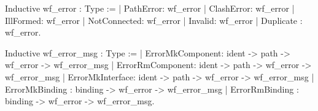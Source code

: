 Inductive wf_error : Type :=
  | PathError: wf_error | ClashError: wf_error
  | IllFormed: wf_error | NotConnected: wf_error
  | Invalid: wf_error   | Duplicate : wf_error.

Inductive wf_error_msg : Type :=
  | ErrorMkComponent: ident -> path -> wf_error -> wf_error_msg
  | ErrorRmComponent: ident -> path -> wf_error -> wf_error_msg
  | ErrorMkInterface: ident -> path -> wf_error -> wf_error_msg
  | ErrorMkBinding  : binding -> wf_error -> wf_error_msg
  | ErrorRmBinding  : binding -> wf_error -> wf_error_msg.